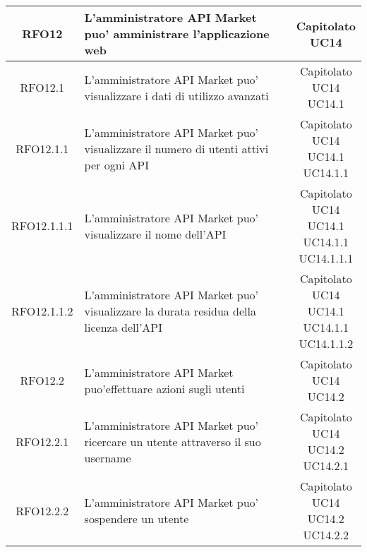 \begin{longtable}{|c|p{8cm}|c|}
\hypertarget{RFO12}{RFO12} &  L'amministratore API Market puo' amministrare l'applicazione web & \makecell*{Capitolato\\UC14} \\
\hline

\hypertarget{RFO12.1}{RFO12.1} &  L'amministratore API Market puo' visualizzare i dati di utilizzo avanzati & \makecell*{Capitolato\\UC14\\UC14.1} \\
\hline

\hypertarget{RFO12.1.1}{RFO12.1.1} &  L'amministratore API Market puo' visualizzare il numero di utenti attivi per ogni API & \makecell*{Capitolato\\UC14\\UC14.1\\UC14.1.1} \\
\hline

\hypertarget{RFO12.1.1.1}{RFO12.1.1.1} &  L'amministratore API Market puo' visualizzare il nome dell'API & \makecell*{Capitolato\\UC14\\UC14.1\\UC14.1.1\\UC14.1.1.1} \\
\hline

\hypertarget{RFO12.1.1.2}{RFO12.1.1.2} &  L'amministratore API Market puo' visualizzare la durata residua della licenza dell'API & \makecell*{Capitolato\\UC14\\UC14.1\\UC14.1.1\\UC14.1.1.2} \\
\hline

\hypertarget{RFO12.2}{RFO12.2} &  L'amministratore API Market puo'effettuare azioni sugli utenti& \makecell*{Capitolato\\UC14\\UC14.2} \\
\hline

\hypertarget{RFO12.2.1}{RFO12.2.1} &  L'amministratore API Market puo' ricercare un utente attraverso il suo username& \makecell*{Capitolato\\UC14\\UC14.2\\UC14.2.1} \\
\hline

\hypertarget{RFO12.2.2}{RFO12.2.2} &  L'amministratore API Market puo' sospendere un utente& \makecell*{Capitolato\\UC14\\UC14.2\\UC14.2.2} \\
\hline


\end{longtable}
